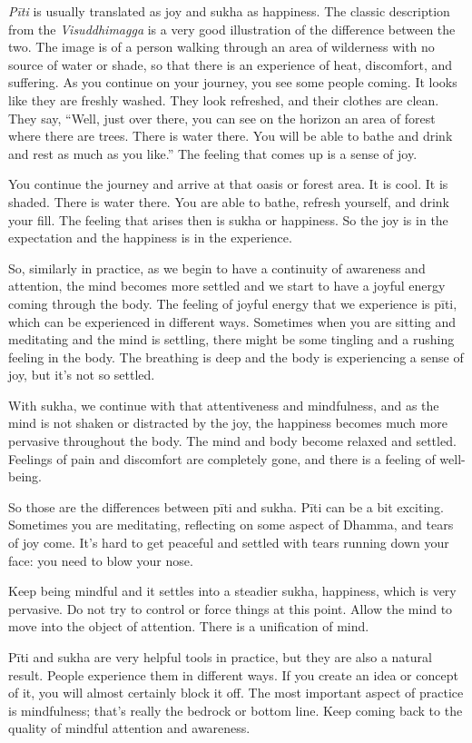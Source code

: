 \emph{Pīti} is usually translated as joy and sukha as happiness. The
classic description from the \emph{Visuddhimagga} is a very good
illustration of the difference between the two. The image is of a person
walking through an area of wilderness with no source of water or shade,
so that there is an experience of heat, discomfort, and suffering. As
you continue on your journey, you see some people coming. It looks like
they are freshly washed. They look refreshed, and their clothes are
clean. They say, “Well, just over there, you can see on the horizon an
area of forest where there are trees. There is water there. You will be
able to bathe and drink and rest as much as you like.” The feeling that
comes up is a sense of joy.

You continue the journey and arrive at that oasis or forest area. It is
cool. It is shaded. There is water there. You are able to bathe, refresh
yourself, and drink your fill. The feeling that arises then is sukha or
happiness. So the joy is in the expectation and the happiness is in the
experience.

So, similarly in practice, as we begin to have a continuity of awareness
and attention, the mind becomes more settled and we start to have a
joyful energy coming through the body. The feeling of joyful energy that
we experience is pīti, which can be experienced in different ways.
Sometimes when you are sitting and meditating and the mind is settling,
there might be some tingling and a rushing feeling in the body. The
breathing is deep and the body is experiencing a sense of joy, but it’s
not so settled.

With sukha, we continue with that attentiveness and mindfulness, and as
the mind is not shaken or distracted by the joy, the happiness becomes
much more pervasive throughout the body. The mind and body become
relaxed and settled. Feelings of pain and discomfort are completely
gone, and there is a feeling of well-being.

So those are the differences between pīti and sukha. Pīti can be a bit
exciting. Sometimes you are meditating, reflecting on some aspect of
Dhamma, and tears of joy come. It’s hard to get peaceful and settled
with tears running down your face: you need to blow your nose.

Keep being mindful and it settles into a steadier sukha, happiness,
which is very pervasive. Do not try to control or force things at this
point. Allow the mind to move into the object of attention. There is a
unification of mind.

Pīti and sukha are very helpful tools in practice, but they are also a
natural result. People experience them in different ways. If you create
an idea or concept of it, you will almost certainly block it off. The
most important aspect of practice is mindfulness; that’s really the
bedrock or bottom line. Keep coming back to the quality of mindful
attention and awareness.
